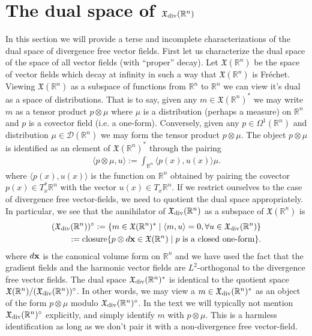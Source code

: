 \documentclass[12pt]{amsart}
\newcommand{\R}{\ensuremath{\mathbb{R}}}
\begin{document}
\section{The dual space of $\mathfrak{X}_{\rm div}(\R^n)$}
\label{sec:measure_valued_momap}
In this section we will provide a terse and incomplete
characterizations of the dual space of divergence free 
vector fields.  First let us characterize the dual space of the space of all vector fields (with ``proper'' decay).
Let $\mathfrak{X}(\R^n)$ be the space of vector fields which decay at infinity
in such a way that $\mathfrak{X}(\R^n)$ is Fr\'echet.
Viewing $\mathfrak{X}(\R^n)$ as a subspace of functions from $\R^n$ to $\R^n$
we can view it's dual as a space of distributions.
That is to say, given any $m \in \mathfrak{X}(\R^n)^*$ we may write $m$ as a tensor
product $p \otimes \mu$ where $\mu$ is a distribution (perhaps a measure)
on $\R^n$ and $p$ is a covector field (i.e. a one-form).
Conversely, given any $p \in \Omega^1(\R^n)$ and distribution $\mu \in \mathcal{D}(\R^n)$
we may form the tensor product $p \otimes \mu$.
The object $p\otimes \mu$ is identified as an element of $\mathfrak{X}(\R^n)^*$ through
the pairing
\begin{align*}
	\langle p \otimes \mu , u \rangle :=  \int_{\R^n} \langle p(x) , u(x) \rangle \mu.
\end{align*}
where $\langle p(x),u(x) \rangle$ is the function on $\R^n$ obtained by pairing the covector $p(x) \in T_x^*\R^n$ with the vector $u(x) \in T_x\R^n$.
If we restrict ourselves to the case of divergence free vector-fields, we need to quotient
the dual space appropriately.  In particular, we see that the annihilator of $\mathfrak{X}_{\rm div}(\R^n)$
as a subspace of $\mathfrak{X}(\R^n)$ is
\begin{align*}
	(\mathfrak{X}_{\rm div}(\R^n) )^\circ := \{ m \in \mathfrak{X}(\R^n)^* \mid \langle m , u \rangle = 0 , \forall u \in \mathfrak{X}_{\rm div}(\R^n) \}\\
		:= {\rm closure}\{ p \otimes d{\bf x} \in \mathfrak{X}(\R^n) \mid p \text{ is a closed one-form} \}.
\end{align*}
where $d{\bf x}$ is the canonical volume form on $\R^n$ and
we have used the fact that the gradient fields and the harmonic vector fields are $L^2$-orthogonal to the divergence free vector fields.
The dual space $\mathfrak{X}_{\rm div}(\R^n)^*$ is identical to the quotient space $\mathfrak{X}(\R^n) / (\mathfrak{X}_{\rm div}(\R^n))^\circ$.
In other words, we may view a $m \in \mathfrak{X}_{\rm div}(\R^n)^*$ as an object of the form $p \otimes \mu$ modulo $\mathfrak{X}_{\rm div}(\R^n)^\circ$.
In the text we will typically not mention $\mathfrak{X}_{\rm div}(\R^n)^\circ$ explicitly, and simply identify $m$ with $p \otimes \mu$.
This is a harmless identification as long as we don't pair it with a non-divergence free vector-field.
\end{document}
